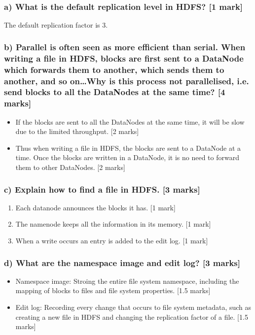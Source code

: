 \documentclass[11pt,a4paper]{article}
\begin{document}
\subsubsection*{a) What is the default replication level in HDFS? [1 mark]}
The default replication factor is 3.
\subsubsection*{b) Parallel is often seen as more efficient than serial. When writing a file in HDFS, blocks are first sent to a DataNode which forwards them to another, which sends them to another, and so on…Why is this process not parallelised, i.e. send blocks to all the DataNodes at the same time? [4 marks]}

\begin{itemize}
\item If the blocks are sent to all the DataNodes at the same time, it will be slow due to the limited throughput. [2 marks]
\item Thus when writing a file in HDFS, the blocks are sent to a DataNode at a time. Once the blocks are written in a DataNode, it is no need to forward them to other DataNodes. [2 marks]
\end{itemize}

\subsubsection*{c) Explain how to find a file in HDFS. [3 marks]}
\begin{enumerate}
	\item Each datanode announces the blocks it has. [1 mark]
	\item The namenode keeps all the information in its memory. [1 mark]
	\item When a write occurs an entry is added to the edit log. [1 mark]
\end{enumerate}

\subsubsection*{d) What are the namespace image and edit log? [3 marks]}

\begin{itemize}
\item Namespace image: Stroing the entire file system namespace,  including the mapping of blocks to files and file system properties. [1.5 marks]
\item Edit log: Recording every change that occurs to file system metadata, such as creating a new file in HDFS and changing the replication factor of a file. [1.5 marks]
\end{itemize}
\end{document}

